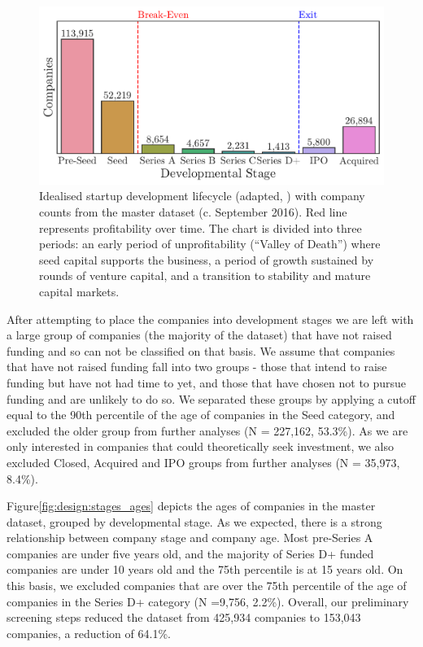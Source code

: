 \documentclass[../thesis/thesis.tex]{subfiles}
\begin{document}
\begin{figure}[!htb]
    \centering
    \includegraphics[width=\textwidth]{../figures/design/lifecycle}
    \caption[Startup development lifecyle]{Idealised startup development lifecycle (adapted, \cite{}) with company counts from the master dataset (c. September 2016). Red line represents profitability over time. The chart is divided into three periods: an early period of unprofitability (``Valley of Death'') where seed capital supports the business, a period of growth sustained by rounds of venture capital, and a transition to stability and mature capital markets.}
    \label{fig:design:lifecycle}
\end{figure}

After attempting to place the companies into development stages we are left with a large group of companies (the majority of the dataset) that have not raised funding and so can not be classified on that basis. We assume that companies that have not raised funding fall into two groups - those that intend to raise funding but have not had time to yet, and those that have chosen not to pursue funding and are unlikely to do so. We separated these groups by applying a cutoff equal to the 90th percentile of the age of companies in the Seed category, and excluded the older group from further analyses (N = 227,162,  53.3\%). As we are only interested in companies that could theoretically seek investment, we also excluded Closed, Acquired and IPO groups from further analyses (N = 35,973, 8.4\%).

Figure\ref{fig:design:stages_ages} depicts the ages of companies in the master dataset, grouped by developmental stage.  As we expected, there is a strong relationship between company stage and company age. Most pre-Series A companies are under five years old, and the majority of Series D+ funded companies are under 10 years old and the 75th percentile is at 15 years old. On this basis, we excluded companies that are over the 75th percentile of the age of companies in the Series D+ category (N =9,756, 2.2\%). Overall, our preliminary screening steps reduced the dataset from 425,934 companies to 153,043 companies, a reduction of 64.1\%.
\end{document}
